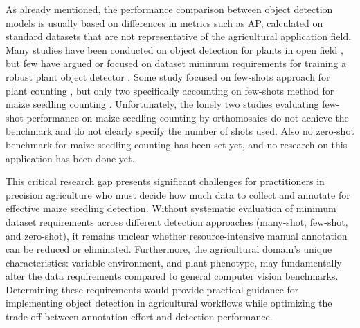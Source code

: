 \documentclass{article}
\begin{document}
As already mentioned, the performance comparison between object detection models is
usually based on differences in metrics such as AP, calculated on standard datasets
that are not representative of the agricultural application field.
Many studies have been conducted on object detection for plants in open field
\cite{barretoAutomaticUAVbasedCounting2021,gengResearchSegmentationMethod2024,jiangDeepSeedlingDeepConvolutional2019,katariIntegratingAutomatedLabeling2024,kitanoCornPlantCounting2019,liDCYOLOImprovedField2024,liSeedlingMaizeCounting2022,liuIntegrateNetDeepLearning2022,liuEstimatingMaizeSeedling2022,luTasselNetCountingMaize2017,macheferMaskRCNNRefitting2020,velumaniEstimatesMaizePlant2021,wangPlotLevelMaizeEarly2023,zhaoStudyLightweightModel2023},
but few have argued or focused on dataset minimum requirements for training a robust plant object detector
\cite{davidPlantDetectionCounting2021,andvaagCountingCanolaGeneralizable2024}.
Some study focused on few-shots approach for plant counting \cite{wangPlotLevelMaizeEarly2023,amirkolaeeAdaTreeFormerFewShot2024},
but only two specifically accounting on few-shots method for maize seedling counting \cite{karamiAutomaticPlantCounting2020,wangAdvancingImageRecognition2024}.
Unfortunately, the lonely two studies evaluating few-shot performance on maize seedling counting 
by orthomosaics do not achieve the benchmark and do not clearly
specify the number of shots used. Also no zero-shot benchmark for maize seedling counting 
has been set yet, and no research on this application has been done yet.

This critical research gap presents significant challenges for practitioners in precision agriculture 
who must decide how much data to collect and annotate for effective maize seedling detection. Without 
systematic evaluation of minimum dataset requirements across different detection approaches (many-shot, 
few-shot, and zero-shot), it remains unclear whether resource-intensive manual annotation can be 
reduced or eliminated. Furthermore, the agricultural domain's unique characteristics: variable environment, 
and plant phenotype, may fundamentally alter the data requirements 
compared to general computer vision benchmarks. Determining these requirements would provide practical 
guidance for implementing object detection in agricultural workflows while optimizing the trade-off between 
annotation effort and detection performance.
\end{document}
